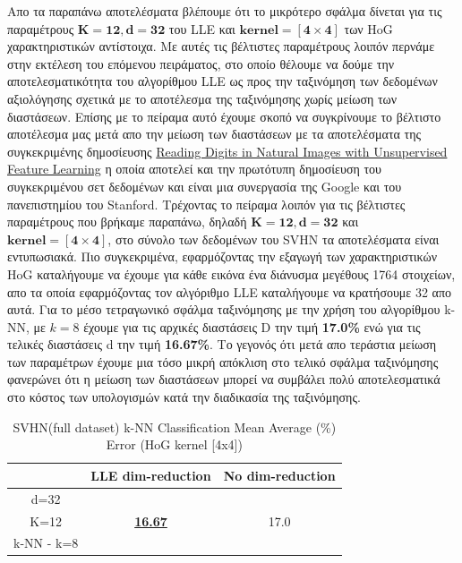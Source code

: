 \par
Απο τα παραπάνω αποτελέσματα βλέπουμε ότι το μικρότερο σφάλμα δίνεται για τις παραμέτρους $\mathbf{K=12, d=32}$ του \textlatin{LLE} και $\mathbf{kernel=[4 \times 4]}$ των \textlatin{HoG} χαρακτηριστικών αντίστοιχα. Με αυτές τις βέλτιστες παραμέτρους λοιπόν περνάμε στην εκτέλεση του επόμενου πειράματος, στο οποίο θέλουμε να δούμε την αποτελεσματικότητα του αλγορίθμου \textlatin{LLE} ως προς την ταξινόμηση των δεδομένων αξιολόγησης σχετικά με το αποτέλεσμα της ταξινόμησης χωρίς μείωση των διαστάσεων. Επίσης με το πείραμα αυτό έχουμε σκοπό να συγκρίνουμε το βέλτιστο αποτέλεσμα μας μετά απο την μείωση των διαστάσεων με τα αποτελέσματα της συγκεκριμένης δημοσίευσης \href{http://ufldl.stanford.edu/housenumbers/nips2011\textunderscore housenumbers.pdf}{\textlatin{Reading Digits in Natural Images
with Unsupervised Feature Learning}} \cite{12} η οποία αποτελεί και την πρωτότυπη δημοσίευση του συγκεκριμένου σετ δεδομένων και είναι μια συνεργασία της \textlatin{Google} και του πανεπιστημίου του \textlatin{Stanford}. Τρέχοντας το πείραμα λοιπόν για τις βέλτιστες παραμέτρους που βρήκαμε παραπάνω, δηλαδή $\mathbf{K=12, d=32}$ και $\mathbf{kernel=[4 \times 4]}$, στο σύνολο των δεδομένων του \textlatin{SVHN} τα αποτελέσματα είναι εντυπωσιακά. Πιο συγκεκριμένα, εφαρμόζοντας την εξαγωγή των χαρακτηριστικών \textlatin{HoG} καταλήγουμε να έχουμε για κάθε εικόνα ένα διάνυσμα μεγέθους 1764 στοιχείων, απο τα οποία εφαρμόζοντας τον αλγόριθμο \textlatin{LLE} καταλήγουμε να κρατήσουμε 32 απο αυτά. Για το μέσο τετραγωνικό σφάλμα ταξινόμησης με την χρήση του αλγορίθμου \textlatin{k-NN}, με $k=8$ έχουμε για τις αρχικές διαστάσεις \textlatin{D} την τιμή \textbf{17.0\%} ενώ για τις τελικές διαστάσεις \textlatin{d} την τιμή \textbf{16.67\%}. Το γεγονός ότι μετά απο τεράστια μείωση των παραμέτρων έχουμε μια τόσο μικρή απόκλιση στο τελικό σφάλμα ταξινόμησης φανερώνει ότι η μείωση των διαστάσεων μπορεί να συμβάλει πολύ αποτελεσματικά στο κόστος των υπολογισμών κατά την διαδικασία της ταξινόμησης.
\begin{table}[H]
\centering
\label{tab:table14}
\begin{tabular}{|c|c|c|}
\hline
 & LLE dim-reduction & No dim-reduction \\
\hline
d=32 & & \\
K=12 & \underline{\textbf{16.67}} & 17.0 \\
k-NN - k=8 & & \\
\hline
\end{tabular}
\caption{SVHN(full dataset) k-NN Classification Mean Average (\%) Error (HoG kernel [4x4])}
\end{table}


